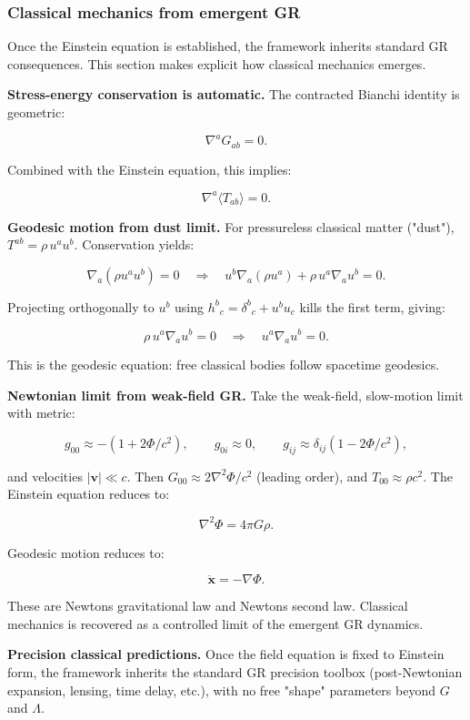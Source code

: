 \subsubsection{Classical mechanics from emergent GR}\label{512-classical-mechanics-from-emergent-gr}

Once the Einstein equation is established, the framework inherits standard GR consequences. This section makes explicit how classical mechanics emerges.

\textbf{Stress-energy conservation is automatic.} The contracted Bianchi identity is geometric:

\[
\nabla^a G_{ab} = 0.
\]

Combined with the Einstein equation, this implies:

\[
\nabla^a \langle T_{ab} \rangle = 0.
\]

\textbf{Geodesic motion from dust limit.} For pressureless classical matter ("dust"), \(T^{ab} = \rho \, u^a u^b\). Conservation yields:

\[
\nabla_a(\rho u^a u^b) = 0
\quad \Rightarrow \quad
u^b \nabla_a(\rho u^a) + \rho \, u^a \nabla_a u^b = 0.
\]

Projecting orthogonally to \(u^b\) using \(h^b{}_c = \delta^b{}_c + u^b u_c\) kills the first term, giving:

\[
\rho \, u^a \nabla_a u^b = 0
\quad \Rightarrow \quad
u^a \nabla_a u^b = 0.
\]

This is the geodesic equation: free classical bodies follow spacetime geodesics.

\textbf{Newtonian limit from weak-field GR.} Take the weak-field, slow-motion limit with metric:

\[
g_{00} \approx -(1 + 2\Phi/c^2), \qquad
g_{0i} \approx 0, \qquad
g_{ij} \approx \delta_{ij}(1 - 2\Phi/c^2),
\]

and velocities \(|\mathbf{v}| \ll c\). Then \(G_{00} \approx 2\nabla^2\Phi/c^2\) (leading order), and \(T_{00} \approx \rho c^2\). The Einstein equation reduces to:

\[
\nabla^2 \Phi = 4\pi G \rho.
\]

Geodesic motion reduces to:

\[
\ddot{\mathbf{x}} = -\nabla \Phi.
\]

These are Newton\textquotesingle s gravitational law and Newton\textquotesingle s second law. Classical mechanics is recovered as a controlled limit of the emergent GR dynamics.

\textbf{Precision classical predictions.} Once the field equation is fixed to Einstein form, the framework inherits the standard GR precision toolbox (post-Newtonian expansion, lensing, time delay, etc.), with no free "shape" parameters beyond \(G\) and \(\Lambda\).

